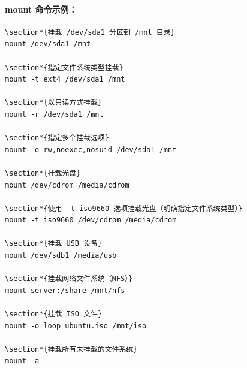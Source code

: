 \documentclass[12pt,UTF8]{ctexbook}
\begin{document}
\paragraph{mount 命令示例：}
\begin{verbatim}
\section*{挂载 /dev/sda1 分区到 /mnt 目录}
mount /dev/sda1 /mnt

\section*{指定文件系统类型挂载}
mount -t ext4 /dev/sda1 /mnt

\section*{以只读方式挂载}
mount -r /dev/sda1 /mnt

\section*{指定多个挂载选项}
mount -o rw,noexec,nosuid /dev/sda1 /mnt

\section*{挂载光盘}
mount /dev/cdrom /media/cdrom

\section*{使用 -t iso9660 选项挂载光盘（明确指定文件系统类型）}
mount -t iso9660 /dev/cdrom /media/cdrom

\section*{挂载 USB 设备}
mount /dev/sdb1 /media/usb

\section*{挂载网络文件系统（NFS）}
mount server:/share /mnt/nfs

\section*{挂载 ISO 文件}
mount -o loop ubuntu.iso /mnt/iso

\section*{挂载所有未挂载的文件系统}
mount -a
\end{verbatim}
\end{document}
